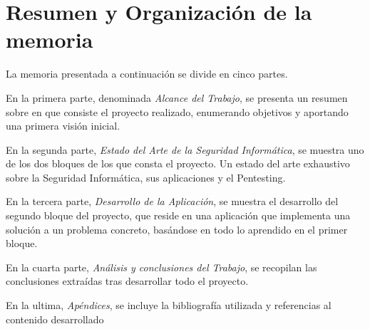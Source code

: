 \chapter[Resumen]{Resumen y Organización de la memoria}

La memoria presentada a continuación se divide en cinco partes.

En la primera parte, denominada \textit{Alcance del Trabajo}, se presenta un resumen sobre en que consiste el proyecto realizado, enumerando objetivos y aportando una primera visión inicial.

En la segunda parte, \textit{Estado del Arte de la Seguridad Informática}, se muestra uno de los dos bloques de los que consta el proyecto. Un estado del arte exhaustivo sobre la Seguridad Informática, sus aplicaciones y el Pentesting.

En la tercera parte, \textit{Desarrollo de la Aplicación}, se muestra el desarrollo del segundo bloque del proyecto, que reside en una aplicación que implementa una solución a un problema concreto, basándose en todo lo aprendido en el primer bloque.

En la cuarta parte, \textit{Análisis y conclusiones del Trabajo}, se recopilan las conclusiones extraídas tras desarrollar todo el proyecto.

En la ultima, \textit{Apéndices}, se incluye la bibliografía utilizada y referencias al contenido desarrollado